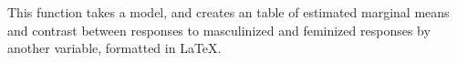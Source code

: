\documentclass[
  bookmarksnumbered]{article}
\newenvironment{Shaded}{\begin{snugshade}}{\end{snugshade}}
\newcommand{\ControlFlowTok}[1]{\textcolor[rgb]{0.94,0.87,0.69}{#1}}
\newcommand{\DecValTok}[1]{\textcolor[rgb]{0.86,0.86,0.80}{#1}}
\newcommand{\FunctionTok}[1]{\textcolor[rgb]{0.94,0.94,0.56}{#1}}
\newcommand{\NormalTok}[1]{\textcolor[rgb]{0.80,0.80,0.80}{#1}}
\newcommand{\OtherTok}[1]{\textcolor[rgb]{0.94,0.94,0.56}{#1}}
\newcommand{\SpecialCharTok}[1]{\textcolor[rgb]{0.86,0.64,0.64}{#1}}
\newcommand{\StringTok}[1]{\textcolor[rgb]{0.80,0.58,0.58}{#1}}
\begin{document}
This function takes a model, and creates an table of estimated marginal means and contrast between responses to masculinized and feminized responses by another variable, formatted in \LaTeX.

\begin{Shaded}
\end{Shaded}
\end{document}

